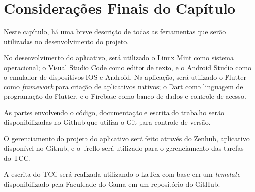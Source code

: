 \section{Considerações Finais do Capítulo}

Neste capítulo, há uma breve descrição de todas as ferramentas que serão 
utilizadas no desenvolvimento do projeto. 

No desenvolvimento do aplicativo, será utilizado o Linux Mint como sistema 
operacional; o Visual Studio Code como editor de texto, e o Android Studio como 
o emulador de dispositivos IOS e Android. Na aplicação, será utilizado o Flutter 
como \emph{framework} para criação de aplicativos nativos; o Dart como linguagem 
de programação do Flutter, e o Firebase como banco de dados e controle de acesso. 

As partes envolvendo o código, documentação e escrita do trabalho serão disponibilizadas 
no Github que utiliza o Git para controle de versão.

O gerenciamento do projeto do aplicativo será feito através do Zenhub, aplicativo disponível no Github, e o Trello será utilizado para o gerenciamento das tarefas do TCC. 

A escrita do TCC será realizada utilizando o LaTex com base em um \emph{template} 
disponibilizado pela Faculdade do Gama em um repositório do GitHub. 


